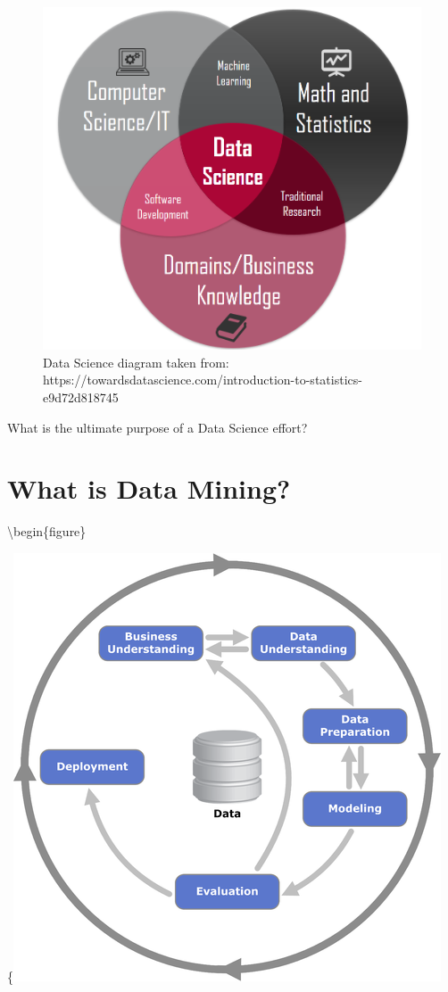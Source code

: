 \documentclass[
]{book}
\begin{document}
\begin{figure}

{\centering \includegraphics[width=0.8\linewidth]{images/datascience} 

}

\caption{Data Science diagram taken from: https://towardsdatascience.com/introduction-to-statistics-e9d72d818745}\label{fig:datascience-fig}
\end{figure}

What is the ultimate purpose of a Data Science effort?

\hypertarget{what-is-data-mining}{%
\section{What is Data Mining?}\label{what-is-data-mining}}

\textbackslash begin\{figure\}

\{\centering \includegraphics[width=0.8\linewidth]{images/crisp}
\end{document}
